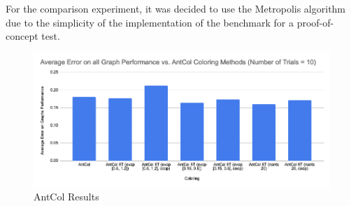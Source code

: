 \documentclass[runningheads]{llncs}
\begin{document}
For the comparison experiment, it was decided to use the Metropolis algorithm due to the simplicity of the implementation of the benchmark for a proof-of-concept test.


\begin{figure}[h]
  \centering
  \includegraphics[width=1\textwidth]{AntCol.png}
  \caption{AntCol Results}
  \label{fig:antcol}
\end{figure}



\clearpage

\printbibliography
\end{document}
